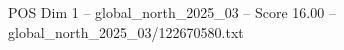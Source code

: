 \begin{textsample}{POS Dim 1 – global\_north\_2025\_03 – Score 16.00 – global\_north\_2025\_03/122670580.txt}
\end{textsample}
